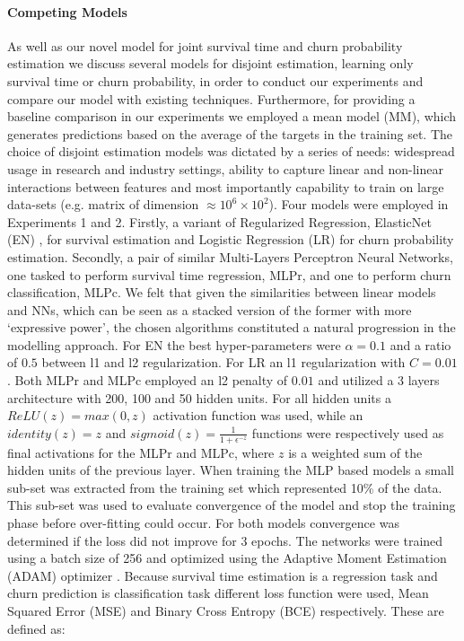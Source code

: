 \paragraph*{Competing Models}
As well as our novel model for joint survival time and churn probability estimation we discuss several models for disjoint estimation, learning only survival time or churn probability, in order to conduct our experiments and  compare our model with existing techniques. Furthermore, for providing a baseline comparison in our experiments we employed a mean model (MM), which generates predictions based on the average of the targets in the training set. The choice of disjoint estimation models was dictated by a series of needs: widespread usage in research and industry settings, ability to capture linear and non-linear interactions between features and most importantly capability to train on large data-sets (e.g. matrix of dimension $\approx10^6\times10^2$). Four models were employed in Experiments 1 and 2. Firstly, a variant of Regularized Regression, ElasticNet (EN) \cite{zou2005regularization}, for survival estimation and Logistic Regression (LR) for churn probability estimation. Secondly, a pair of similar Multi-Layers Perceptron Neural Networks, one tasked to perform survival time regression, MLPr, and one to perform churn classification, MLPc. We felt that given the similarities between linear models and NNs, which can be seen as a stacked version of the former with more `expressive power', the chosen algorithms constituted a natural progression in the modelling approach. For EN the best hyper-parameters were $\alpha = 0.1$ and a ratio of $0.5$ between l1 and l2 regularization. For LR an l1 regularization with $C = 0.01$. Both MLPr and MLPc employed an l2 penalty of $0.01$ and utilized a 3 layers architecture with 200, 100 and 50 hidden units. For all hidden units a $ReLU(z) = max(0, z)$ activation function was used, while an  $identity(z) = z$ and $ sigmoid(z) = \frac {1} {1 + \epsilon^{-z}}$ functions were respectively used as final activations for the MLPr and MLPc, where $z$ is a weighted sum of the hidden units of the previous layer. When training the MLP based models a small sub-set was extracted from the training set which represented 10\% of the data. This sub-set was used to evaluate convergence of the model and stop the training phase before over-fitting could occur. For both models convergence was determined if the loss did not improve for 3 epochs. The networks were trained using a batch size of 256 and optimized using the Adaptive Moment Estimation (ADAM) optimizer \cite{kingma2014adam}. Because survival time estimation is a regression task and churn prediction is classification task different loss function were used, Mean Squared Error (MSE) and Binary Cross Entropy (BCE) respectively. These are defined as:

